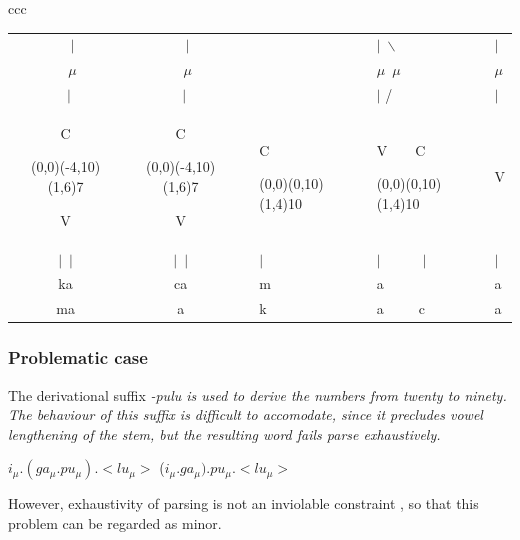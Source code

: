 \begin{tabular}{ccc}
\begin{tabular}{ccllll}
~~$\mid$&~~$\mid$&          & & $\mid$~$\backslash$    & $\mid$\\
~~$\mu$&~~$\mu$&            & & $\mu$~$\mu$   & $\mu$\\
~$\mid$&~$\mid$&            & & $\mid$ /~~~~~ & $\mid$\\
C\begin{picture}(0,0)\put(-4,10){\line(1,6){7}}\end{picture}V & C\begin{picture}(0,0)\put(-4,10){\line(1,6){7}}\end{picture}V &                   &C\begin{picture}(0,0)\put(0,10){\line(1,4){10}}\end{picture}& V~~~~C\begin{picture}(0,0)\put(0,10){\line(1,4){10}}\end{picture}   & V\\
$\mid$~$\mid$&$\mid$~$\mid$ & & $\mid$ & $\mid$~~~~~~$\mid$ & $\mid$\\
ka & ca&                    &m& a~~~~~\dentt   & a\\
ma & \dentt a&                    &k& a~~~~~c   & a\\
\end{tabular}                            
\end{tabular}
\z

\subsubsection{Problematic case}\label{sec:phon:Problematiccase}
The derivational suffix \em -pulu \em is used to derive the numbers from twenty to ninety. The behaviour of this suffix is difficult to accomodate, since it precludes vowel lengthening of the stem, but the resulting word fails parse exhaustively.

\ea
	\ea \dentt$ i_\mu.(ga_\mu.pu_\mu).<lu_\mu>$
	\ex (\dentt$ i_\mu.ga_\mu).pu_\mu.<lu_\mu>$
\z\z

However, exhaustivity of parsing is not an inviolable constraint \citep{abc}, so that this problem can be regarded as minor.


% 


